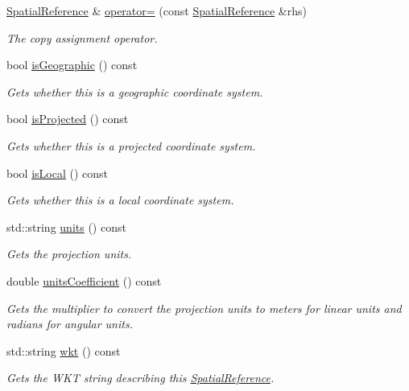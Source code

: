 \begin{DoxyCompactItemize}
\hyperlink{classdg_1_1deepcore_1_1geometry_1_1_spatial_reference}{Spatial\+Reference} \& \hyperlink{group___imagery_module_gab5c9702deb9e8e005780196b5a5b7b4f}{operator=} (const \hyperlink{classdg_1_1deepcore_1_1geometry_1_1_spatial_reference}{Spatial\+Reference} \&rhs)
\begin{DoxyCompactList}\small\item\em The copy assignment operator. \end{DoxyCompactList}\item 
bool \hyperlink{group___imagery_module_ga104ad283cf3f583194751ebb95ccd36c}{is\+Geographic} () const 
\begin{DoxyCompactList}\small\item\em Gets whether this is a geographic coordinate system. \end{DoxyCompactList}\item 
bool \hyperlink{group___imagery_module_gaae4f5ba455b10e8f1964f9f20b4c486a}{is\+Projected} () const 
\begin{DoxyCompactList}\small\item\em Gets whether this is a projected coordinate system. \end{DoxyCompactList}\item 
bool \hyperlink{group___imagery_module_gad3e91dd4112c714c81850ab4c4dc0d2d}{is\+Local} () const 
\begin{DoxyCompactList}\small\item\em Gets whether this is a local coordinate system. \end{DoxyCompactList}\item 
std\+::string \hyperlink{group___imagery_module_gabd8135b44030a971a078c0d8fbe2be26}{units} () const 
\begin{DoxyCompactList}\small\item\em Gets the projection units. \end{DoxyCompactList}\item 
double \hyperlink{group___imagery_module_gad2a19eadaf57004567c09badf4fdaab3}{units\+Coefficient} () const 
\begin{DoxyCompactList}\small\item\em Gets the multiplier to convert the projection units to meters for linear units and radians for angular units. \end{DoxyCompactList}\item 
std\+::string \hyperlink{group___imagery_module_ga82c05ce0a6e02aa7cec17a68131b5263}{wkt} () const 
\begin{DoxyCompactList}\small\item\em Gets the W\+KT string describing this \hyperlink{classdg_1_1deepcore_1_1geometry_1_1_spatial_reference}{Spatial\+Reference}. \end{DoxyCompactList}\item 

\end{DoxyCompactItemize}
